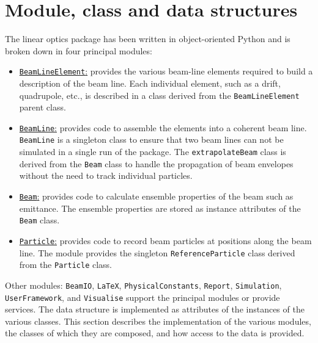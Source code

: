         \graphicspath{ {A1-MCD/Figures/} }

\section{Module, class and data structures}

The linear optics package has been written in object-oriented Python
and is broken down in four principal modules:
\begin{itemize}
  \item \underline{\texttt{BeamLineElement}:} provides the various
    beam-line elements required to build a description of the beam
    line.
    Each individual element, such as a drift, quadrupole, etc., is
    described in a class derived from the \texttt{BeamLineElement}
    parent class.
  \item \underline{\texttt{BeamLine}:} provides code to assemble the
    elements into a coherent beam line.
    \texttt{BeamLine} is a singleton class to ensure that two beam
    lines can not be simulated in a single run of the package.
    The \texttt{extrapolateBeam} class is derived from
    the \texttt{Beam} class to handle the propagation of beam
    envelopes without the need to track individual particles.
  \item \underline{\texttt{Beam}:} provides code to calculate
    ensemble properties of the beam such as emittance.
    The ensemble properties are stored as instance attributes of
    the \texttt{Beam} class.
  \item \underline{\texttt{Particle}:} provides code to record beam
    particles at positions along the beam line.
    The module provides the singleton \texttt{ReferenceParticle}
    class derived from the \texttt{Particle} class.
\end{itemize}
Other modules: \texttt{BeamIO}, \texttt{LaTeX},
\texttt{PhysicalConstants}, \texttt{Report}, \texttt{Simulation},
\texttt{UserFramework}, and \texttt{Visualise}
support the principal modules or provide services.
The data structure is implemented as attributes of the instances of the 
various classes.
This section describes the implementation of the various modules, the
classes of which they are composed, and how access to the data is
provided.

